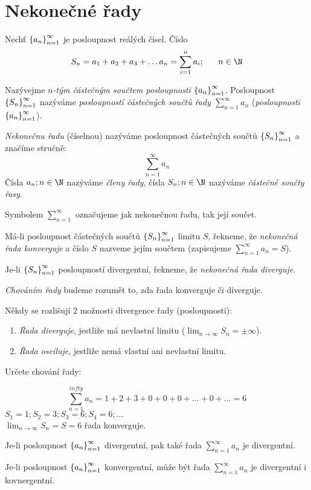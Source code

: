 
\BeginDoc{}
\def\posloup{$\zs{a_n}_{n=1}^{\infty}$}
\def\pos#1{\zs{#1}_{n=1}^{\infty}}
\def\li{\lim_{n\rightarrow\infty}}
\def\sup{{\rm sup\ }}
\def\sciwinfup{{\rm inf\ }}
\def\su{\sum_{n=1}^{\infty}}
\section{Nekonečné řady}
\Def Nechť $\pos{a_n}$ je posloupnost reálých čísel. Číslo
$$ S_n = a_1 + a_2 + a_3 + \dots a_n = \sum_{i=1}^n a_i; \ \ \  \ \ n\in\N$$

Nazývejme \emph{$n$-tým částečným součtem posloupnosti} \posloup.
Posloupnost $\pos{S_n}$ nazýváme \emph{posloupností částečných součtů řady $\sum_{n=1}^{\infty} a_n$} (\emph{posloupnosti $\pos{a_n}$}).


\emph{Nekonečnu řadu} (číselnou) nazýváme posloupnost částečných součtů
$\pos{S_n}$ a značíme stručně:
$$ \sum_{n=1}^\infty a_n $$
Čísla $a_n; n\in\N$ nazýváme \emph{členy řady}, čísla $S_n;n\in\N$ nazýváme \emph{částečné součty řasy}.

\Poz Symbolem $\sum_{n=1}^{\infty}$ označujeme jak nekonečnou řadu, tak její součet.

\Def Má-li posloupnost částečných součtů $\pos{S_n}$ limitu $S$, řekneme, že
\emph{nekonečná řada konverguje} a číslo $S$ nazveme jejím součtem (zapisujeme
$\sum_{n=1}^{\infty} a_n = S$).

Je-li $\pos{S_n}$ posloupností divergentní, řekneme, že \emph{nekonečná řada diverguje}.

\Pozenum
\emph{Chováním řady} budeme rozumět to, zda řada konverguje či diverguje.
\item Někdy se rozlišují 2 možnosti divergence řady (posloupnosti):
	\begin{enumerate}
		\item \emph{Řada diverguje}, jestliže má nevlastní limitu
			($\li S_n = \pm \infty$).
		\item \emph{Řada osciluje}, jestliže nemá vlastní ani nevlastní limitu.
	\end{enumerate}
\End
\Pr Určete chování řady:

$$\sum_{n=1}^{infty} a_n = 1 + 2 + 3 + 0 + 0 + 0 +\dots + 0 + \dots = 6$$
$S_1 = 1;S_2=3;S_3=6;S_4=6;\dots$\\
$\li S_n = S = 6$ řada konverguje.

\Pozenum
Je-li posloupnost $\pos{a_n}$ divergentní, pak také řada $\su a_n$ je divergentní.
\item Je-li posloupnost $\pos{a_n}$ konvergentní, může být řada $\su a_n$ je divergentní i kovnergentní.
\End

